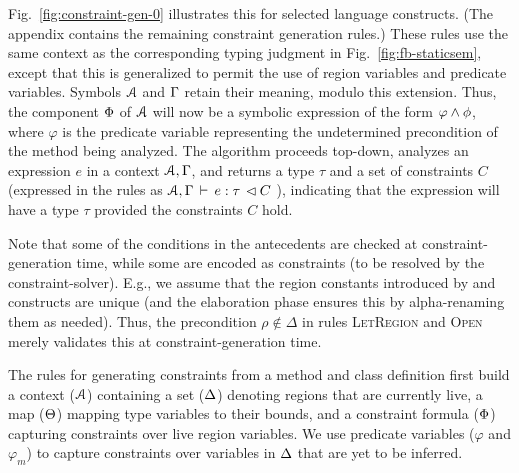Fig.~\ref{fig:constraint-gen-0} illustrates this for selected language constructs.
(The appendix contains the remaining constraint generation rules.)
These rules use the same context as the corresponding typing judgment in
Fig.~\ref{fig:fb-staticsem}, except that this is generalized to permit the
use of region variables and predicate variables.
Symbols ${\mathcal{A}}$ and $\Gamma$ retain their meaning, modulo this extension.
Thus, the component $\Phi$ of ${\mathcal{A}}$ will now be a symbolic expression
of the form $\varphi \wedge \phi$, where $\varphi$ is the predicate variable
representing the undetermined precondition of the method being analyzed.
The algorithm proceeds top-down, analyzes an expression $e$ in a context
${\mathcal{A}},\Gamma$, and returns a type $\tau$ and a set of constraints $C$
(expressed in the rules as ${{\mathcal{A}},\Gamma} \, \vdash \, {e} : {\tau} \, \lhd {C}$ ),
indicating that the expression will have a type $\tau$ provided the constraints $C$ hold.

Note that some of the conditions in the antecedents are checked at constraint-generation
time, while some are encoded as constraints (to be resolved by the constraint-solver).
E.g., we assume that the region constants introduced by
and
constructs are unique (and the elaboration phase ensures this by alpha-renaming
them as needed). Thus, the precondition $\rho \not\in \Delta$ in rules \textsc{LetRegion}
and \textsc{Open} merely validates this at constraint-generation time.

The rules for generating constraints from a method and
class definition first build a context (${\mathcal{A}}$) containing a set ($ \Delta$) denoting
regions that are currently live, a map ($\Theta$) mapping type
variables to their bounds, and a constraint formula ($\Phi$)
capturing constraints over live region variables. We use predicate
variables ($\varphi$ and $\varphi_m$) to capture constraints over
variables in $\Delta$ that are yet to be inferred.

%

